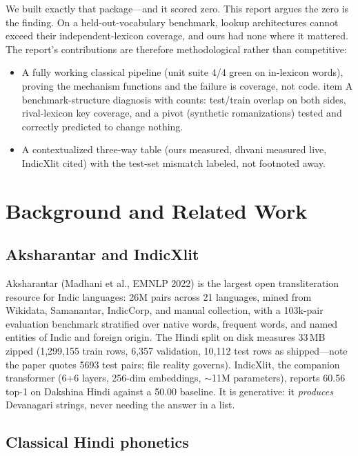 \documentclass[11pt,a4paper]{article}
\begin{document}
We built exactly that package---and it scored zero. This report argues the zero is the finding. On a held-out-vocabulary benchmark, lookup architectures cannot exceed their independent-lexicon coverage, and ours had none where it mattered. The report's contributions are therefore methodological rather than competitive:

\begin{itemize}
    \item A fully working classical pipeline (unit suite 4/4 green on in-lexicon words), proving the mechanism functions and the failure is coverage, not code.
   item A benchmark-structure diagnosis with counts: test/train overlap on both sides, rival-lexicon key coverage, and a pivot (synthetic romanizations) tested and correctly predicted to change nothing.
    \item A contextualized three-way table (ours measured, dhvani measured live, IndicXlit cited) with the test-set mismatch labeled, not footnoted away.
\end{itemize}

\section{Background and Related Work}

\subsection{Aksharantar and IndicXlit}

Aksharantar (Madhani et al., EMNLP 2022) is the largest open transliteration resource for Indic languages: 26M pairs across 21 languages, mined from Wikidata, Samanantar, IndicCorp, and manual collection, with a 103k-pair evaluation benchmark stratified over native words, frequent words, and named entities of Indic and foreign origin. The Hindi split on disk measures 33\,MB zipped (1,299,155 train rows, 6,357 validation, 10,112 test rows as shipped---note the paper quotes 5693 test pairs; file reality governs). IndicXlit, the companion transformer (6+6 layers, 256-dim embeddings, $\sim$11M parameters), reports 60.56 top-1 on Dakshina Hindi against a 50.00 baseline. It is generative: it \textit{produces} Devanagari strings, never needing the answer in a list.

\subsection{Classical Hindi phonetics}
\end{document}
